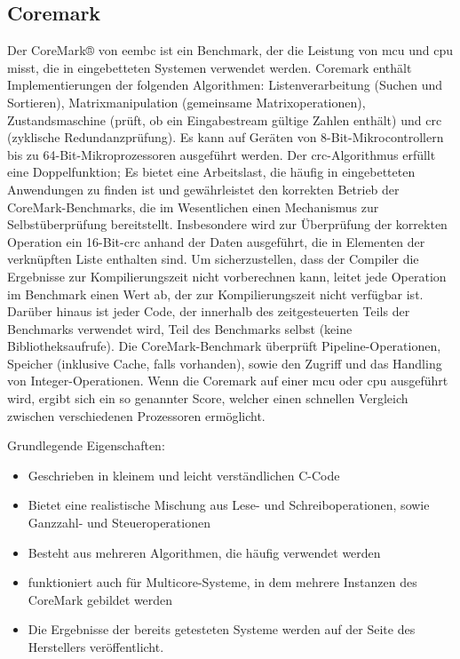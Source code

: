   \subsection{Coremark}\label{kap:coremark}
  Der CoreMark® von \ac{eembc} ist ein Benchmark, der die Leistung von \ac{mcu} und \ac{cpu} misst, die in eingebetteten Systemen verwendet werden.
   Coremark enthält Implementierungen der folgenden Algorithmen: Listenverarbeitung (Suchen und Sortieren),
    Matrixmanipulation (gemeinsame Matrixoperationen), Zustandsmaschine (prüft, ob ein Eingabestream gültige Zahlen enthält) und \ac{crc} (zyklische Redundanzprüfung).
    Es kann auf Geräten von 8-Bit-Mikrocontrollern bis zu 64-Bit-Mikroprozessoren ausgeführt werden.
  Der \ac{crc}-Algorithmus erfüllt eine Doppelfunktion; Es bietet eine Arbeitslast, die häufig in eingebetteten Anwendungen zu finden ist
  und gewährleistet den korrekten Betrieb der CoreMark-Benchmarks, die im Wesentlichen einen Mechanismus zur Selbstüberprüfung bereitstellt.
   Insbesondere wird zur Überprüfung der korrekten Operation ein 16-Bit-\ac{crc} anhand der Daten ausgeführt, die in Elementen der verknüpften Liste enthalten sind.
  Um sicherzustellen, dass der Compiler die Ergebnisse zur Kompilierungszeit nicht vorberechnen kann, leitet jede Operation im Benchmark einen Wert ab,
  der zur Kompilierungszeit nicht verfügbar ist. Darüber hinaus ist jeder Code, der innerhalb des zeitgesteuerten Teils der Benchmarks verwendet wird,
  Teil des Benchmarks selbst (keine Bibliotheksaufrufe).
  Die CoreMark-Benchmark überprüft Pipeline-Operationen, Speicher (inklusive Cache, falls vorhanden), sowie den Zugriff und das Handling von Integer-Operationen.
  Wenn die Coremark auf einer \ac{mcu} oder \ac{cpu} ausgeführt wird, ergibt sich ein so genannter Score, welcher einen schnellen Vergleich zwischen verschiedenen Prozessoren ermöglicht.~\cite{coremark}


  Grundlegende Eigenschaften:
\begin{itemize}
  \item Geschrieben in kleinem und leicht verständlichen C-Code
  \item Bietet eine realistische Mischung aus Lese- und Schreiboperationen, sowie Ganzzahl- und Steueroperationen
  \item Besteht aus mehreren Algorithmen, die häufig verwendet werden
  \item funktioniert auch für Multicore-Systeme, in dem mehrere Instanzen des CoreMark gebildet werden
  \item Die Ergebnisse der bereits getesteten Systeme werden auf der Seite des Herstellers veröffentlicht.
\end{itemize}

